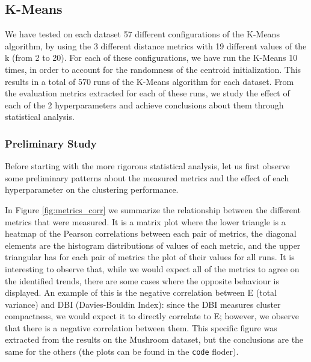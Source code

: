 \subsection{K-Means}
We have tested on each dataset 57 different configurations of the K-Means algorithm, by using the 3 different distance metrics with 19 different values of the k (from 2 to 20). For each of these configurations, we have run the K-Means 10 times, in order to account for the randomness of the centroid initialization. This results in a total of 570 runs of the K-Means algorithm for each dataset. From the evaluation metrics extracted for each of these runs, we study the effect of each of the 2 hyperparameters and achieve conclusions about them through statistical analysis.

\subsubsection{Preliminary Study}
Before starting with the more rigorous statistical analysis, let us first observe some preliminary patterns about the measured metrics and the effect of each hyperparameter on the clustering performance.

In Figure \ref{fig:metrics_corr} we summarize the relationship between the different metrics that were measured. It is a matrix plot where the lower triangle is a heatmap of the Pearson correlations between each pair of metrics, the diagonal elements are the histogram distributions of values of each metric, and the upper triangular has for each pair of metrics the plot of their values for all runs. It is interesting to observe that, while we would expect all of the metrics to agree on the identified trends, there are some cases where the opposite behaviour is displayed. An example of this is the negative correlation between E (total variance) and DBI (Davies-Bouldin Index): since the DBI measures cluster compactness, we would expect it to directly correlate to E; however, we observe that there is a negative correlation between them. This specific figure was extracted from the results on the Mushroom dataset, but the conclusions are the same for the others (the plots can be found in the \texttt{code} floder).

